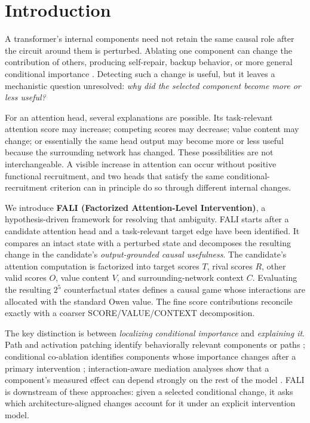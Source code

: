 \section{Introduction}\label{sec:intro}

A transformer's internal components need not retain the same causal role after the circuit around them is perturbed. Ablating one component can change the contribution of others, producing self-repair, backup behavior, or more general conditional importance \citep{mcgrath2023hydra,mcdougall2023copysuppression,rushing2024selfrepair,gong2026coax}. Detecting such a change is useful, but it leaves a mechanistic question unresolved: \emph{why did the selected component become more or less useful?}

For an attention head, several explanations are possible. Its task-relevant attention score may increase; competing scores may decrease; value content may change; or essentially the same head output may become more or less useful because the surrounding network has changed. These possibilities are not interchangeable. A visible increase in attention can occur without positive functional recruitment, and two heads that satisfy the same conditional-recruitment criterion can in principle do so through different internal changes.

We introduce \textbf{FALI (Factorized Attention-Level Intervention)}, a hypothesis-driven framework for resolving that ambiguity. FALI starts after a candidate attention head and a task-relevant target edge have been identified. It compares an intact state with a perturbed state and decomposes the resulting change in the candidate's \emph{output-grounded causal usefulness}. The candidate's attention computation is factorized into target scores $T$, rival scores $R$, other valid scores $O$, value content $V$, and surrounding-network context $C$. Evaluating the resulting $2^5$ counterfactual states defines a causal game whose interactions are allocated with the standard Owen value. The fine score contributions reconcile exactly with a coarser SCORE\slash VALUE\slash CONTEXT decomposition.

The key distinction is between \emph{localizing conditional importance} and \emph{explaining it}. Path and activation patching identify behaviorally relevant components or paths \citep{goldowskydill2023pathpatching,zhang2024activationpatching,heimersheim2024activationpatching}; conditional co-ablation identifies components whose importance changes after a primary intervention \citep{gong2026coax}; interaction-aware mediation analyses show that a component's measured effect can depend strongly on the rest of the model \citep{vaidyanathan2026curse}. FALI is downstream of these approaches: given a selected conditional change, it asks which architecture-aligned changes account for it under an explicit intervention model.

